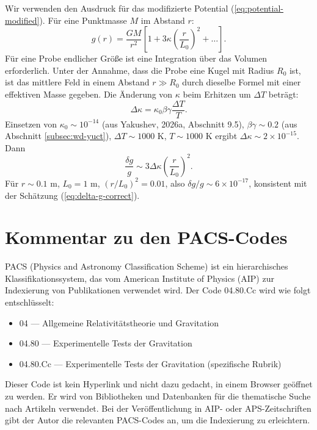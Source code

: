 \documentclass[12pt]{article}
\theoremstyle{remark}
\begin{document}
	Wir verwenden den Ausdruck für das modifizierte Potential (\ref{eq:potential-modified}). Für eine Punktmasse $M$ im Abstand $r$:
	\begin{equation}
		g(r) = \frac{GM}{r^2} \left[ 1 + 3\kappa \left( \frac{r}{L_0} \right)^2 + \dots \right].
		\label{eq:g-modified}
	\end{equation}
	Für eine Probe endlicher Größe ist eine Integration über das Volumen erforderlich. Unter der Annahme, dass die Probe eine Kugel mit Radius $R_0$ ist, ist das mittlere Feld in einem Abstand $r \gg R_0$ durch dieselbe Formel mit einer effektiven Masse gegeben. Die Änderung von $\kappa$ beim Erhitzen um $\Delta T$ beträgt:
	\begin{equation}
		\Delta\kappa = \kappa_0 \beta\gamma \frac{\Delta T}{T}.
		\label{eq:delta-kappa}
	\end{equation}
	Einsetzen von $\kappa_0 \sim 10^{-14}$ (aus Yakushev, 2026a, Abschnitt 9.5), $\beta\gamma \sim 0.2$ (aus Abschnitt \ref{subsec:wd-yuct}), $\Delta T \sim 1000$ K, $T \sim 1000$ K ergibt $\Delta\kappa \sim 2\times10^{-15}$. Dann
	\begin{equation}
		\frac{\delta g}{g} \sim 3\Delta\kappa \left( \frac{r}{L_0} \right)^2.
		\label{eq:delta-g-final}
	\end{equation}
	Für $r \sim 0.1$ m, $L_0 = 1$ m, $(r/L_0)^2 = 0.01$, also $\delta g/g \sim 6\times10^{-17}$, konsistent mit der Schätzung (\ref{eq:delta-g-correct}).
	
	\section{Kommentar zu den PACS-Codes}
	\label{app:pacs}
	
	PACS (Physics and Astronomy Classification Scheme) ist ein hierarchisches Klassifikationssystem, das vom American Institute of Physics (AIP) zur Indexierung von Publikationen verwendet wird. Der Code 04.80.Cc wird wie folgt entschlüsselt:
	\begin{itemize}
		\item 04 — Allgemeine Relativitätstheorie und Gravitation
		\item 04.80 — Experimentelle Tests der Gravitation
		\item 04.80.Cc — Experimentelle Tests der Gravitation (spezifische Rubrik)
	\end{itemize}
	Dieser Code ist kein Hyperlink und nicht dazu gedacht, in einem Browser geöffnet zu werden. Er wird von Bibliotheken und Datenbanken für die thematische Suche nach Artikeln verwendet. Bei der Veröffentlichung in AIP- oder APS-Zeitschriften gibt der Autor die relevanten PACS-Codes an, um die Indexierung zu erleichtern.
	
\end{document}
